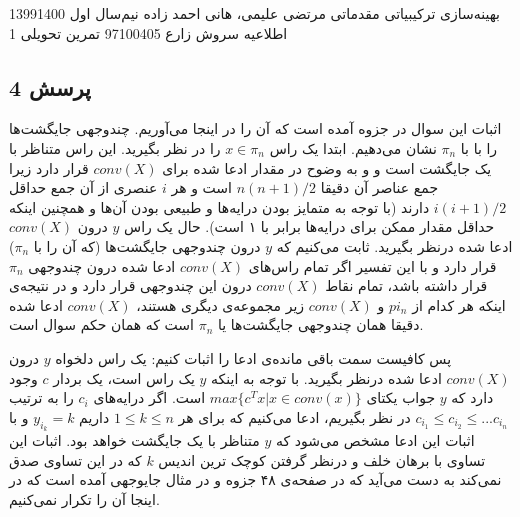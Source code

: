 \documentclass[a4paper,12pt]{article}
\newcounter{problemcounter}
\newcounter{subproblemcounter}
\newcommand{\problem}[1]
{
	\subsection*{
		پرسش
		#1
	}
}
\begin{document}
\handout
{بهینه‌سازی ترکیبیاتی مقدماتی}
{مرتضی علیمی، هانی احمد زاده}
{نیم‌سال اول 1399\lr{-}1400}
{اطلاعیه}
{سروش زارع}
{97100405}
 {تمرین تحویلی 1}
\problem{4}
اثبات این سوال در جزوه آمده است که آن را در اینجا می‌آوریم.
\newline
چندوجهی جایگشت‌ها را با
 با $\pi_n$
 نشان می‌دهیم.
\newline
ابتدا یک راس
$x \in \pi_n$
را در نظر بگیرید. این راس متناظر با یک جایگشت است و  و به وضوح در مقدار ادعا شده برای $conv(X)$  قرار دارد زیرا جمع عناصر آن دقیقا
$n(n+1)/2$
است و هر $i$ عنصری از آن جمع حداقل
$i(i+1)/2$
دارند (با توجه به متمایز بودن درایه‌ها و طبیعی بودن آن‌ها و همچنین اینکه حداقل مقدار ممکن برای درایه‌ها برابر با ۱ است).
\newline
\newline
حال یک راس $y$ درون $conv(X)$ ادعا شده درنظر بگیرید. ثابت می‌کنیم که
$y$
درون چندوجهی جایگشت‌ها (که آن را با $\pi_n$) قرار دارد و با این تفسیر اگر تمام راس‌های $conv(X)$ ادعا شده درون چندوجهی $\pi_n$ قرار داشته باشد، تمام نقاط $conv(X)$ درون این چندوجهی قرار دارد و در نتیجه‌ی اینکه هر کدام از 
$pi_n$
و $conv(X)$ زیر مجموعه‌ی دیگری هستند، 
$conv(X)$
ادعا شده دقیقا همان
چندوجهی جایگشت‌ها یا
$\pi_n$
است که همان حکم سوال است.

پس کافیست سمت باقی مانده‌ی ادعا را اثبات کنیم:
یک راس دلخواه
$y$
درون $conv(X)$ ادعا شده درنظر بگیرید. با توجه به اینکه $y$ یک راس است، یک بردار $c$ وجود دارد که $y$ جواب یکتای
$max\{c^Tx | x \in conv(x) \}$
است.  اگر درایه‌های 
$c_i$
را به ترتیب
$c_{i_1} \leq c_{i_2} \leq ... c_{i_n}$
در نظر بگیریم، ادعا می‌کنیم که برای هر 
$1 \leq k \leq n$
داریم
$y_{i_k} = k$
و با اثبات این ادعا مشخص می‌شود که $y$ متناظر با یک جایگشت خواهد بود.
اثبات این تساوی با برهان خلف و درنظر گرفتن کوچک ترین اندیس $k$ که در این تساوی صدق نمی‌کند به دست می‌آید که در صفحه‌ی ۴۸ جزوه و در مثال جایوجهی آمده است که در اینجا آن را تکرار نمی‌کنیم.
\end{document}
